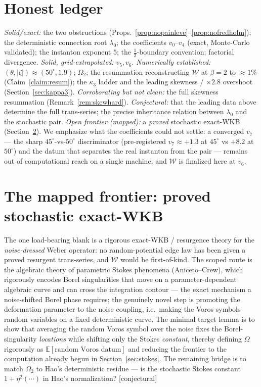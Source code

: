 \documentclass[11pt,reqno]{amsart}
\theoremstyle{plain}
\theoremstyle{definition}
\theoremstyle{remark}
\newcommand{\E}{\mathbb{E}}
\newcommand{\W}{\mathcal{W}}
\newcommand{\lz}{\lambda_0}
\newcommand{\tagX}{{\footnotesize\textsf{[conjectural]}}}
\begin{document}
\section{Honest ledger}\label{sec:ledger}

\emph{Solid/exact:} the two obstructions (Props.~\ref{prop:nopainleve}--\ref{prop:nofredholm});
the deterministic connection root $\lz$; the coefficients $v_0$--$v_4$ (exact, Monte-Carlo
validated); the instanton exponent $5$; the $\tfrac12$-boundary convention; factorial
divergence. \emph{Solid, grid-extrapolated:} $v_5,v_6$. \emph{Numerically established:}
$(\theta,|\zeta|)\approx(50^\circ,1.9)$; $\Omega_2$; the resummation reconstructing $\W$ at
$\beta=2$ to $\approx1\%$ (Claim~\ref{claim:resum}); the $\kappa_3$ ladder and the leading
skewness / $\times2.8$ overshoot (Section~\ref{sec:kappa3}). \emph{Corroborating but not clean:}
the full skewness resummation (Remark~\ref{rem:skewhard}). \emph{Conjectural:} that the leading data
above determine the full trans-series; the precise inheritance relation between $\lz$ and the
stochastic pair. \emph{Open frontier (mapped):} a \emph{proved} stochastic exact-WKB
(Section~\ref{sec:frontier}). We emphasize what the coefficients could not settle: a converged
$v_7$ --- the sharp $45^\circ$-vs-$50^\circ$ discriminator (pre-registered $v_7\approx+1.3$ at
$45^\circ$ vs $+8.2$ at $50^\circ$) and the datum that separates the real instanton from the
pair --- remains out of computational reach on a single machine, and $\W$ is finalized here at
$v_6$.

\section{The mapped frontier: proved stochastic exact-WKB}\label{sec:frontier}

The one load-bearing blank is a rigorous exact-WKB / resurgence theory for the
\emph{noise-dressed} Weber operator: no random-potential edge law has been given a proved
resurgent trans-series, and $\W$ would be first-of-kind. The scoped route is the algebraic theory of
parametric Stokes phenomena (Aniceto--Crew), which rigorously encodes Borel singularities that
move on a parameter-dependent algebraic curve and can cross the integration contour --- the exact
mechanism a noise-shifted Borel phase requires; the genuinely novel step is promoting the
deformation parameter to the noise coupling, i.e.\ making the Voros symbols random variables on
a fixed deterministic curve. The minimal target lemma is to show that averaging the random Voros
symbol over the noise fixes the Borel-singularity \emph{locations} while shifting only the Stokes
\emph{constant}, thereby defining $\Omega$ rigorously as $\E[\text{random Voros datum}]$ and
reducing the frontier to the computation already begun in Section~\ref{sec:stokes}. The remaining
bridge is to match $\Omega_2$ to Hao's deterministic residue --- is the stochastic Stokes
constant $1+\eta^2(\cdots)$ in Hao's normalization? \tagX
\end{document}
